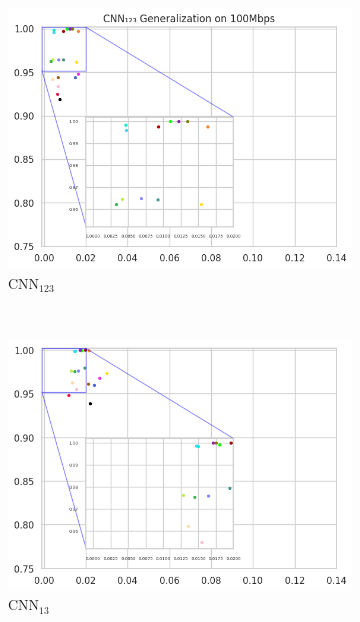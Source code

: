 \documentclass[a4paper,fleqn]{cas-sc}
\begin{document}
\begin{figure}[h!]
\begin{minipage}[t]{0.46\textwidth}
			\begin{subfigure}[t]{0.33\textwidth}
				\includegraphics[draft=false, width=\textwidth]{./figs/Generalizacao-CNN123-100Mbps.png} 
				\caption{CNN$_{123}$}
				\label{fig:Generalizacao-CNN123-100Mbps}
			\end{subfigure}%
			~
			\begin{subfigure}[t]{0.33\textwidth}
				\includegraphics[draft=false, width=\textwidth]{./figs/Generalizacao-CNN13-100Mbps.png} 
				\caption{CNN$_{13}$}
				\label{fig:Generalizacao-CNN13-100Mbps}
			\end{subfigure}%
			~
			\begin{subfigure}[t]{0.33\textwidth}

\end{subfigure}
\end{minipage}
\end{figure}
\end{document}
